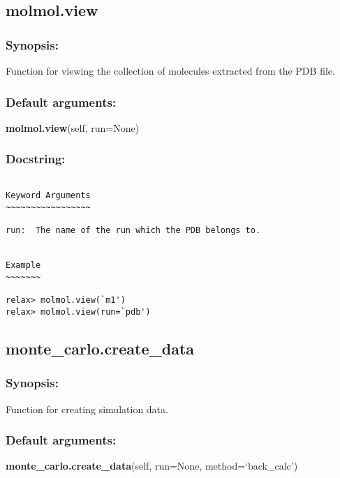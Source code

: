 \newpage

\subsection{molmol.view}


\subsubsection{Synopsis:}

Function for viewing the collection of molecules extracted from the PDB file.

\subsubsection{Default arguments:}

\textsf{\textbf{molmol.view}(self, run=None)
}


\subsubsection{Docstring:}

{\scriptsize
\begin{verbatim}

Keyword Arguments
~~~~~~~~~~~~~~~~~

run:  The name of the run which the PDB belongs to.


Example
~~~~~~~

relax> molmol.view(`m1')
relax> molmol.view(run=`pdb')
\end{verbatim}
}



\newpage

\subsection{monte\_carlo.create\_data}


\subsubsection{Synopsis:}

Function for creating simulation data.

\subsubsection{Default arguments:}

\textsf{\textbf{monte\_carlo.create\_data}(self, run=None, method=`back\_calc')
}


